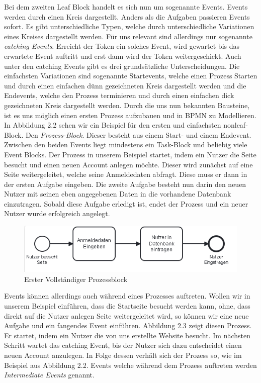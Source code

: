 Bei dem zweiten Leaf Block handelt es sich nun um sogenannte Events. Events werden durch einen Kreis dargestellt. Anders als die Aufgaben passieren Events sofort. Es gibt unterschiedliche Typen, welche durch unterschiedliche Variationen eines Kreises dargestellt werden. Für uns relevant sind allerdings nur sogenannte \emph{catching Events}.  Erreicht der Token ein solches Event, wird gewartet bis das erwartete Event auftritt und erst dann wird der Token weitergeschickt. Auch unter den catching Events gibt es drei grundsätzliche Unterscheidungen. Die einfachsten Variationen sind sogenannte Startevents, welche einen Prozess Starten und durch einen einfachen dünn gezeichneten Kreis dargestellt werden und die Endevents, welche den Prozess terminieren und durch einen einfachen dick gezeichneten Kreis dargestellt werden. 
Durch die uns nun bekannten Bausteine, ist es uns möglich einen ersten Prozess aufzubauen und in BPMN zu Modellieren. In Abbildung 2.2 sehen wir ein Beispiel für den ersten und einfachsten nonleaf-Block. Den \emph{Prozess-Block}. Dieser besteht aus einem Start- und einem Endevent. Zwischen den beiden Events liegt mindestens ein Task-Block und beliebig viele Event Blocks. Der Prozess in unserem Beispiel startet, indem ein Nutzer die Seite besucht und einen neuen Account anlegen möchte. Dieser wird zunächst auf eine Seite weitergeleitet, welche seine Anmeldedaten abfragt. Diese muss er dann in der ersten Aufgabe eingeben. Die zweite Aufgabe besteht nun darin den neuen Nutzer mit seinen eben angegebenen Daten in die vorhandene Datenbank einzutragen. Sobald diese Aufgabe erledigt ist, endet der Prozess und ein neuer Nutzer wurde erfolgreich angelegt. 

\begin{figure}
\centering
\includegraphics[scale=1.0]{Figures/Beispiel2}
\decoRule
\caption[Prozess Block]{Erster Vollständiger Prozessblock}
\label{fig:Task}
\end{figure}

Events können allerdings auch während eines Prozesses auftreten. Wollen wir in unserem Beispiel einführen, dass die Startseite besucht werden kann, ohne, dass direkt auf die Nutzer anlegen Seite weitergeleitet wird, so können wir eine neue Aufgabe und ein fangendes Event einführen. Abbildung 2.3 zeigt diesen Prozess. Er startet, indem ein Nutzer die von uns erstellte Website besucht. Im nächsten Schritt wartet das catching Event, bis der Nutzer sich dazu entscheidet einen neuen Account anzulegen. In Folge dessen verhält sich der Prozess so, wie im Beispiel aus Abbildung 2.2. Events welche während dem Prozess auftreten werden \emph{Intermediate Events} genannt.

